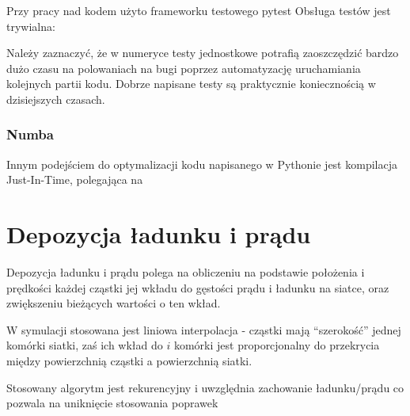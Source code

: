 Przy pracy nad kodem użyto frameworku testowego pytest %
Obsługa testów jest trywialna:

Należy zaznaczyć, że w numeryce testy jednostkowe potrafią zaoszczędzić bardzo dużo czasu na polowaniach na bugi
poprzez automatyzację uruchamiania kolejnych partii kodu. Dobrze napisane testy są praktycznie koniecznością w dzisiejszych
czasach. %

\subsubsection{Numba}

Innym podejściem do optymalizacji kodu napisanego w Pythonie jest kompilacja Just-In-Time, polegająca na %

\section{Depozycja ładunku i prądu}

Depozycja ładunku i prądu polega na obliczeniu na podstawie położenia i prędkości każdej cząstki jej wkładu do
gęstości prądu i ładunku na siatce, oraz zwiększeniu bieżących wartości o ten wkład.

W symulacji stosowana jest liniowa interpolacja - cząstki mają ``szerokość'' jednej komórki siatki, zaś ich wkład do $i$
komórki jest proporcjonalny do przekrycia między powierzchnią cząstki a powierzchnią siatki.

Stosowany algorytm jest rekurencyjny i uwzględnia zachowanie ładunku/prądu %
co pozwala na uniknięcie stosowania poprawek %
